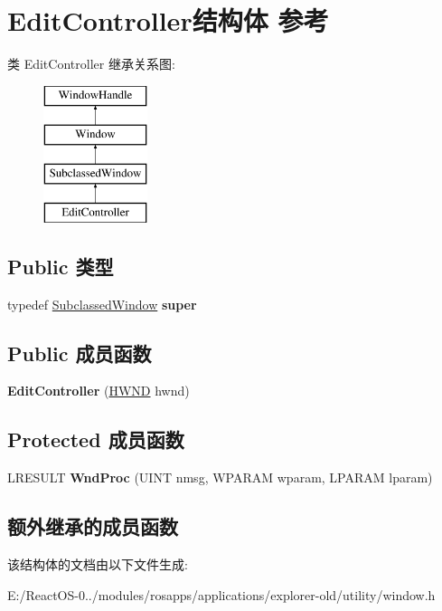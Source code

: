 \hypertarget{struct_edit_controller}{}\section{Edit\+Controller结构体 参考}
\label{struct_edit_controller}
类 Edit\+Controller 继承关系图\+:\begin{figure}[H]
\begin{center}
\leavevmode
\includegraphics[height=4.000000cm]{struct_edit_controller}
\end{center}
\end{figure}
\subsection*{Public 类型}
\begin{DoxyCompactItemize}
\item 
\mbox{\label{struct_edit_controller_a1f2dee9a764fbaf33c232945f021db59}} 
typedef \hyperlink{struct_subclassed_window}{Subclassed\+Window} {\bfseries super}
\end{DoxyCompactItemize}
\subsection*{Public 成员函数}
\begin{DoxyCompactItemize}
\item 
\mbox{\label{struct_edit_controller_a21b1ccea8265f88cc49f5dd23137f9d1}} 
{\bfseries Edit\+Controller} (\hyperlink{interfacevoid}{H\+W\+ND} hwnd)
\end{DoxyCompactItemize}
\subsection*{Protected 成员函数}
\begin{DoxyCompactItemize}
\item 
\mbox{\label{struct_edit_controller_a43db91f725cc2440e5793611b29ce71a}} 
L\+R\+E\+S\+U\+LT {\bfseries Wnd\+Proc} (U\+I\+NT nmsg, W\+P\+A\+R\+AM wparam, L\+P\+A\+R\+AM lparam)
\end{DoxyCompactItemize}
\subsection*{额外继承的成员函数}


该结构体的文档由以下文件生成\+:\begin{DoxyCompactItemize}
\item 
E\+:/\+React\+O\+S-\/0../modules/rosapps/applications/explorer-\/old/utility/window.\+h\end{DoxyCompactItemize}
